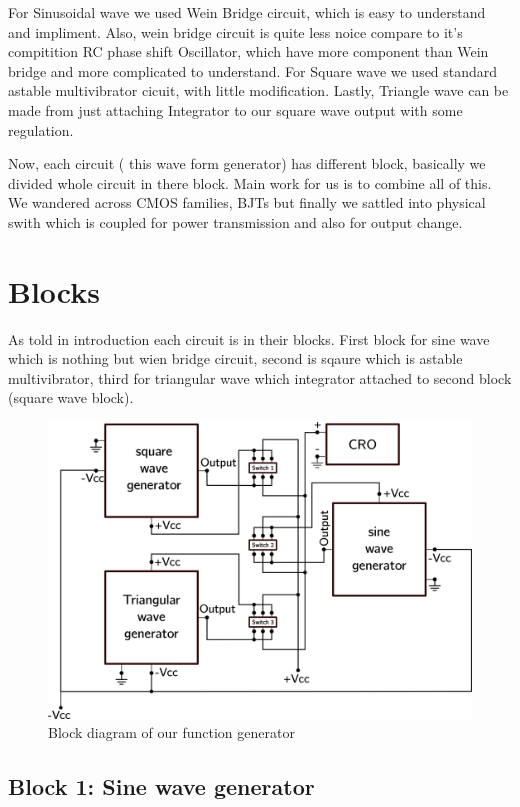 \documentclass{article}
\begin{document}
For Sinusoidal wave we used Wein Bridge circuit, which is easy to understand and impliment. Also, wein bridge circuit is quite less noice compare to it's compitition RC phase shift Oscillator, which have more component than Wein bridge and more complicated to understand. For Square wave we used standard astable multivibrator cicuit, with little modification. Lastly, Triangle wave can be made from just attaching Integrator to our square wave output with some regulation.

Now, each circuit ( this wave form generator) has different block, basically we divided whole circuit in there block. Main work for us is to combine all of this. We wandered across CMOS families, BJTs but finally we sattled into physical swith which is coupled for power transmission and also for output change.

\section{Blocks}
\label{sec:orgaa23a61}


As told in introduction each circuit is in their blocks. First block for sine wave which is nothing but wien bridge circuit, second is sqaure which is astable multivibrator, third for triangular wave which integrator attached to second block (square wave block).


\begin{figure}[htbp]
\centering
\includegraphics[width=.95\textwidth]{imgs/blocks.png}
\caption{\label{fig:org8486585}Block diagram of our function generator}
\end{figure}


\subsection{Block 1: Sine wave generator}
\label{sec:orga76e445}
\end{document}
